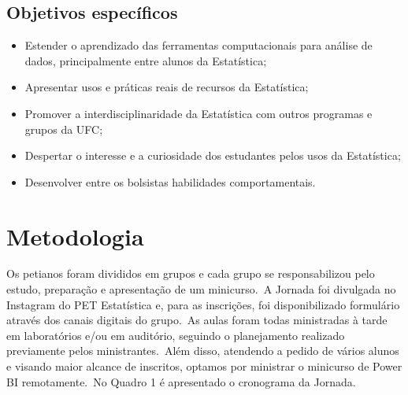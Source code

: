\documentclass{sciposter}
\begin{document}
\begin{multicols}{2}
{ \subsection{Objetivos específicos}
 \begin{itemize}
 \item Estender o aprendizado das ferramentas computacionais para análise de dados, principalmente entre alunos da Estatística;
 \item Apresentar usos e práticas reais de recursos da Estatística;
 \item Promover a interdisciplinaridade da Estatística com outros programas e grupos da UFC;
 \item Despertar o interesse e a curiosidade dos estudantes pelos usos da Estatística;
 \item Desenvolver entre os bolsistas habilidades comportamentais.  
 \end{itemize}
\vspace{0.35cm}
 
\vspace{0.2cm}
\section{Metodologia}

Os petianos foram divididos em grupos e cada grupo se responsabilizou pelo estudo, preparação e apresentação de um minicurso.\ A Jornada foi divulgada no Instagram do PET Estatística e, para as inscrições, foi disponibilizado formulário através dos canais digitais do grupo.\ As aulas foram todas ministradas à tarde em laboratórios e/ou em auditório, seguindo o planejamento realizado previamente pelos ministrantes.\ Além disso, atendendo a pedido de vários alunos e visando maior alcance de inscritos, optamos por ministrar o minicurso de Power BI remotamente.\ No Quadro 1 é apresentado o cronograma da Jornada. 

}
\end{multicols}
\end{document}
